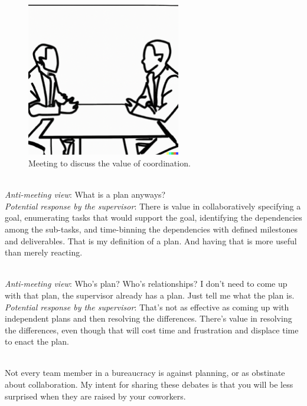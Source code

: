 \begin{figure}[H]
    \centering
\includegraphics[width=0.6\textwidth]{images/confrontational_meeting_of_two_people_in_a_conference_room_both_are_seated.pdf}
    \caption{Meeting to discuss the value of coordination.}
    \label{fig:meeting-to-discuss-coordination}
\end{figure}


\ \\
\textit{Anti-meeting view}: What is a plan anyways?\\
\textit{Potential response by the supervisor}: There is value in collaboratively specifying a goal, enumerating tasks that would support the goal, identifying the dependencies among the sub-tasks, and time-binning the dependencies with defined milestones and deliverables. That is my definition of a plan. And having that is more useful than merely reacting.

\ \\
\textit{Anti-meeting view}: Who's plan? Who's relationships? I don't need to come up with that plan, the supervisor already has a plan. Just tell me what the plan is.\\
\textit{Potential response by the supervisor}: That's not as effective as coming up with independent plans and then resolving the differences. There's value in resolving the differences, even though that will cost time and frustration and displace time to enact the plan.


\ \\

Not every team member in a bureaucracy is against planning, or as obstinate about collaboration. 
My intent for sharing these debates is that you will be less surprised when they are raised by your coworkers. 
